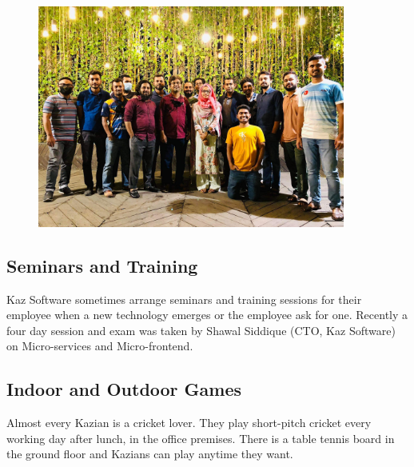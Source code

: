 \begin{figure}[h]
    \begin{center}
        \includegraphics[width=0.9\textwidth]{images/Chapter2/green_lounge.jpeg}
        \label{fig:CEO_Tour}
    \end{center}
\end{figure}

\subsection{Seminars and Training}

Kaz Software sometimes arrange seminars and training sessions for their employee when a new technology emerges or the employee ask for one.
Recently a four day session and exam was taken by Shawal Siddique (CTO, Kaz Software) on Micro-services and Micro-frontend.
\\



\subsection{Indoor and Outdoor Games}

Almost every Kazian is a cricket lover.
They play short-pitch cricket every working day after lunch, in the office premises.
There is a table tennis board in the ground floor and Kazians can play anytime they want.
\\


